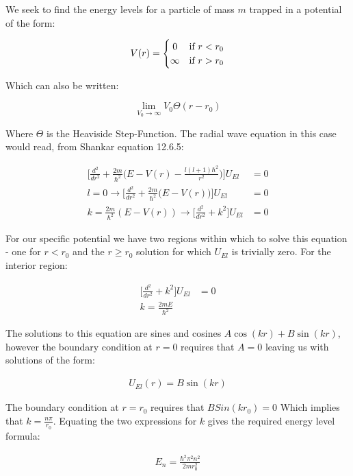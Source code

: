 \documentclass[paper=a4, fontsize=11pt]{scrartcl} %
\numberwithin{equation}{section} %
\numberwithin{figure}{section} %
\numberwithin{table}{section} %
\begin{document}
We seek to find the energy levels for a particle of mass $m$ trapped in a potential of the form:

\[
  V(r) = \left\{\def\arraystretch{1.2}%
  \begin{array}{@{}c@{\quad}l@{}}
    0 & \text{if $r<r_0$}\\
    \infty & \text{if $r > r_0$}\\
  \end{array}\right.
\]

Which can also be written:

\begin{equation}
\lim_{V_0\to\infty} V_0 \Theta(r-r_0)
\end{equation}

Where $\Theta$ is the Heaviside Step-Function. The radial wave equation in this case would read, from Shankar equation 12.6.5:


\begin{align}
\bigg[ \frac{d^2}{dr^2} + \frac{2m}{\hbar^2} \bigg(E - V(r) - \frac{l (l + 1) \hbar^2}{r^2} \bigg) \bigg] U_{El} &= 0 \\ 
l = 0 \rightarrow \bigg[ \frac{d^2}{dr^2} + \frac{2m}{\hbar^2} \bigg(E - V(r) \bigg) \bigg] U_{El} &= 0 \\
k = \frac{2m}{\hbar^2}(E - V(r)) \rightarrow \bigg[\frac{d^2}{dr^2} + k^2\bigg]U_{El} &= 0
\end{align}

For our specific potential we have two regions within which to solve this equation - one for $r<r_0$ and the $r \geq r_0$ solution for which $U_{El}$ is trivially zero. For the interior region:

\begin{align}
\bigg[\frac{d^2}{dr^2} + k^2\bigg]U_{El} &= 0 \\
k = \frac{2 m E}{\hbar^2}
\end{align}

The solutions to this equation are sines and cosines $A \cos(kr) + B \sin(kr)$, however the boundary condition at $r=0$ requires that $A=0$ leaving us with solutions of the form:

\begin{align}
U_{El}(r) = B \sin(kr)
\end{align}

The boundary condition at $r=r_0$ requires that $B Sin(kr_0) = 0$ Which implies that $k = \frac{n \pi}{r_0}$. Equating the two expressions for $k$ gives the required energy level formula:

\begin{align}
E_n = \frac{\hbar^2 \pi^2 n^2}{2 m r_0^2}
\end{align}
\end{document}
